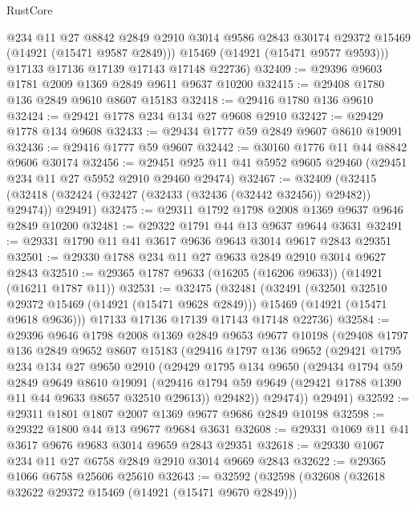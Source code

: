 \begin{lexlean}{RustCore}
\begin{coremodule}
          @234
          @11
          @27
          @8842
          @2849
          @2910
          @3014
          @9586
          @2843
          @30174
          @29372
          @15469
          (@14921 (@15471 @9587 @2849)))
        @15469
        (@14921 (@15471 @9577 @9593)))
      @17133
      @17136
      @17139
      @17143
      @17148
      @22736)
@32409 := @29396 @9603 @1781 @2009 @1369 @2849 @9611 @9637 @10200
@32415 := @29408 @1780 @136 @2849 @9610 @8607 @15183
@32418 := @29416 @1780 @136 @9610
@32424 := @29421 @1778 @234 @134 @27 @9608 @2910
@32427 := @29429 @1778 @134 @9608
@32433 := @29434 @1777 @59 @2849 @9607 @8610 @19091
@32436 := @29416 @1777 @59 @9607
@32442 := @30160 @1776 @11 @44 @8842 @9606 @30174
@32456 := @29451 @925 @11 @41 @5952 @9605 @29460 (@29451 @234 @11 @27 @5952 @2910 @29460 @29474)
@32467 := @32409
    (@32415 (@32418 (@32424 (@32427 (@32433 (@32436 (@32442 @32456)) @29482)) @29474)) @29491)
@32475 := @29311 @1792 @1798 @2008 @1369 @9637 @9646 @2849 @10200
@32481 := @29322 @1791 @44 @13 @9637 @9644 @3631
@32491 := @29331 @1790 @11 @41 @3617 @9636 @9643 @3014 @9617 @2843 @29351
@32501 := @29330 @1788 @234 @11 @27 @9633 @2849 @2910 @3014 @9627 @2843
@32510 := @29365 @1787 @9633 (@16205 (@16206 @9633)) (@14921 (@16211 @1787 @11))
@32531 := @32475
    (@32481
      (@32491
        (@32501 @32510 @29372 @15469 (@14921 (@15471 @9628 @2849)))
        @15469
        (@14921 (@15471 @9618 @9636)))
      @17133
      @17136
      @17139
      @17143
      @17148
      @22736)
@32584 := @29396
    @9646
    @1798
    @2008
    @1369
    @2849
    @9653
    @9677
    @10198
    (@29408
      @1797
      @136
      @2849
      @9652
      @8607
      @15183
      (@29416
        @1797
        @136
        @9652
        (@29421
          @1795
          @234
          @134
          @27
          @9650
          @2910
          (@29429
            @1795
            @134
            @9650
            (@29434
              @1794
              @59
              @2849
              @9649
              @8610
              @19091
              (@29416 @1794 @59 @9649 (@29421 @1788 @1390 @11 @44 @9633 @8657 @32510 @29613))
              @29482))
          @29474))
      @29491)
@32592 := @29311 @1801 @1807 @2007 @1369 @9677 @9686 @2849 @10198
@32598 := @29322 @1800 @44 @13 @9677 @9684 @3631
@32608 := @29331 @1069 @11 @41 @3617 @9676 @9683 @3014 @9659 @2843 @29351
@32618 := @29330 @1067 @234 @11 @27 @6758 @2849 @2910 @3014 @9669 @2843
@32622 := @29365 @1066 @6758 @25606 @25610
@32643 := @32592
    (@32598
      (@32608
        (@32618 @32622 @29372 @15469 (@14921 (@15471 @9670 @2849)))

\end{coremodule}
\end{lexlean}
